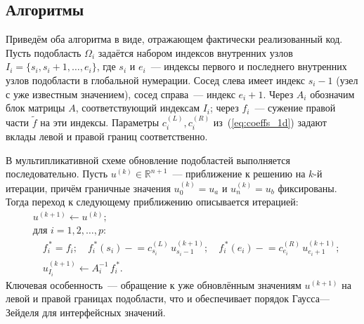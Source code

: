 \subsection{Алгоритмы}

Приведём оба алгоритма в виде, отражающем фактически реализованный код.
Пусть подобласть $\Omega_i$ задаётся набором индексов внутренних узлов
$I_i=\{s_i, s_i+1, \dots, e_i\}$, где $s_i$ и $e_i$~--- индексы первого и
последнего внутренних узлов подобласти в глобальной нумерации. Сосед слева
имеет индекс $s_i-1$ (узел с уже известным значением), сосед справа~---
индекс $e_i+1$. Через $A_i$ обозначим блок матрицы $A$, соответствующий
индексам $I_i$; через $f_i$~--- сужение правой части $\tilde{f}$ на эти
индексы. Параметры $c^{(L)}_i, c^{(R)}_i$ из~(\ref{eq:coeffs_1d}) задают
вклады левой и правой границ соответственно.

В мультипликативной схеме обновление подобластей выполняется
последовательно. Пусть $u^{(k)}\in\mathbb{R}^{n+1}$~--- приближение к решению
на $k$-й итерации, причём граничные значения $u^{(k)}_0=u_a$ и $u^{(k)}_n=u_b$
фиксированы. Тогда переход к следующему приближению описывается итерацией:
\begin{equation}\label{eq:mult_method}
\begin{aligned}
    &u^{(k+1)} \leftarrow u^{(k)};\\
    &\text{для } i = 1, 2, \dots, p:\\
    &\quad
    f_i^{\,*} = f_i;\quad
    f_i^{\,*}(s_i) \mathrel{-}= c^{(L)}_{s_i}\,u^{(k+1)}_{s_i - 1};\quad
    f_i^{\,*}(e_i) \mathrel{-}= c^{(R)}_{e_i}\,u^{(k+1)}_{e_i + 1};\\
    &\quad
    u^{(k+1)}_{I_i} \leftarrow A_i^{-1}\,f_i^{\,*}.
\end{aligned}
\end{equation}
Ключевая особенность~--- обращение к уже обновлённым значениям $u^{(k+1)}$ на
левой и правой границах подобласти, что и обеспечивает порядок Гаусса---Зейделя
для интерфейсных значений.

